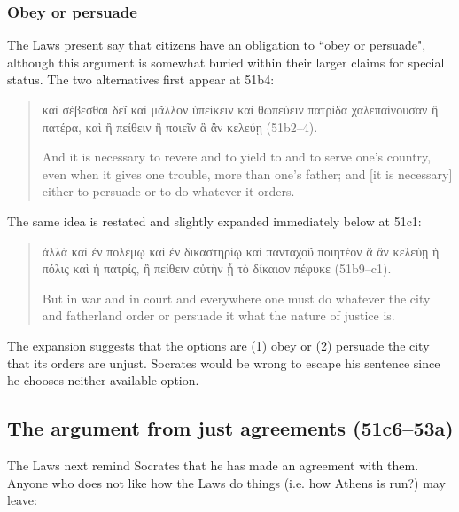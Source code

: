 \documentclass[12pt,letterpaper]{article}
\begin{document}

\subsubsection*{Obey or persuade}

The Laws present say that citizens have an obligation to ``obey or persuade", although this argument is somewhat buried within their larger claims for special status. The two alternatives first appear at 51b4:

\begin{quote}

    \textgreek{καὶ σέβεσθαι δεῖ καὶ μᾶλλον ὑπείκειν καὶ θωπεύειν πατρίδα χαλεπαίνουσαν ἢ πατέρα, καὶ ἢ πείθειν ἢ ποιεῖν ἃ ἂν κελεύῃ} (51b2--4).

    And it is necessary to revere and to yield to and to serve one's country, even when it gives one trouble, more than one's father; and [it is necessary] either to persuade or to do whatever it orders.

\end{quote}

The same idea is restated and slightly expanded immediately below at 51c1:

\begin{quote}

    \textgreek{ἀλλὰ καὶ ἐν πολέμῳ καὶ ἐν δικαστηρίῳ καὶ πανταχοῦ ποιητέον ἃ ἂν κελεύῃ ἡ πόλις καὶ ἡ πατρίς, ἢ πείθειν αὐτὴν ᾗ τὸ δίκαιον πέφυκε} (51b9--c1).

    But in war and in court and everywhere one must do whatever the city and fatherland order or persuade it what the nature of justice is.

\end{quote}

The expansion suggests that the options are (1) obey or (2) persuade the city that its orders are unjust. Socrates would be wrong to escape his sentence since he chooses neither available option.



\subsection*{The argument from just agreements (51c6--53a)}

The Laws next remind Socrates that he has made an agreement with them. Anyone who does not like how the Laws do things (i.e. how Athens is run?) may leave:
\end{document}
